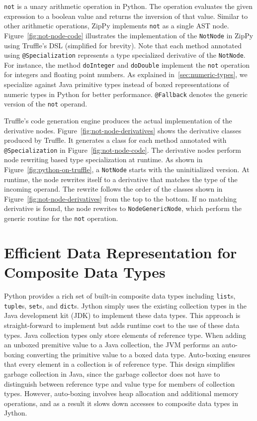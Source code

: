\texttt{not} is a unary arithmetic operation in Python.
The operation evaluates the given expression to a boolean value and returns the inversion of that value.
Similar to other arithmetic operations, ZipPy implements \texttt{not} as a single AST node.
Figure~\ref{fig:not-node-code} illustrates the implementation of the \texttt{NotNode} in ZipPy using Truffle's DSL (simplified for brevity).
Note that each method annotated using \texttt{@Specialization} represents a type specialized derivative of the \texttt{NotNode}.
For instance, the method \texttt{doInteger} and \texttt{doDouble} implement the \texttt{not} operation for integers and floating point numbers.
As explained in~\ref{sec:numeric-types}, we specialize against Java primitive types instead of boxed representations of numeric types in Python for better performance.
\texttt{@Fallback} denotes the generic version of the \texttt{not} operand.

Truffle's code generation engine produces the actual implementation of the derivative nodes.
Figure~\ref{fig:not-node-derivatives} shows the derivative classes produced by Truffle.
It generates a class for each method annotated with \texttt{@Specialization} in Figure~\ref{fig:not-node-code}.
The derivative nodes perform node rewriting based type specialization at runtime.
As shown in Figure~\ref{fig:python-on-truffle}, a \texttt{NotNode} starts with the uninitialized version.
At runtime, the node rewrites itself to a derivative that matches the type of the incoming operand.
The rewrite follows the order of the classes shown in Figure~\ref{fig:not-node-derivatives} from the top to the bottom.
If no matching derivative is found, the node rewrites to \texttt{NodeGenericNode}, which perform the generic routine for the \texttt{not} operation.

\section{Efficient Data Representation for Composite Data Types}

Python provides a rich set of built-in composite data types including \texttt{list}s, \texttt{tuple}s, \texttt{set}s, and \texttt{dict}s.
Jython simply uses the existing collection types in the Java development kit (JDK) to implement these data types.
This approach is straight-forward to implement but adds runtime cost to the use of these data types.
Java collection types only store elements of reference type.
When adding an unboxed premitive value to a Java collection, the JVM performs an auto-boxing converting the primitive value to a boxed data type.
Auto-boxing ensures that every element in a collection is of reference type.
This design simplifies garbage collection in Java, since the garbage collector does not have to distinguish between reference type and value type for members of collection types.
However, auto-boxing involves heap allocation and additional memory operations, and as a result it slows down accesses to composite data types in Jython.

